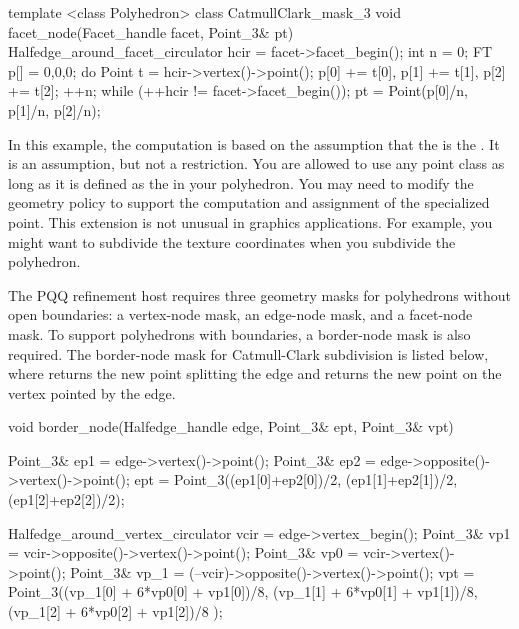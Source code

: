 \begin{ccExampleCode}
template <class Polyhedron>
class CatmullClark_mask_3 {
  void facet_node(Facet_handle facet, Point_3& pt) {
    Halfedge_around_facet_circulator hcir = facet->facet_begin();
    int n = 0;
    FT p[] = {0,0,0};
    do {
      Point t = hcir->vertex()->point();
      p[0] += t[0], p[1] += t[1], p[2] += t[2]; 
      ++n;
    } while (++hcir != facet->facet_begin());
    pt = Point(p[0]/n, p[1]/n, p[2]/n);
  }
}
\end{ccExampleCode}

In this example, the computation is based on the assumption that
the  is the . It is an assumption, 
but not a restriction.
You are allowed to use any point class as long as it is
defined as the  in your polyhedron.
You may need to modify the geometry policy to support the computation
and assignment of the specialized point. This extension is not unusual 
in graphics applications. For example, you might want to subdivide the
texture coordinates when you subdivide the polyhedron. 

The PQQ refinement host requires three geometry masks for 
polyhedrons without open boundaries: a vertex-node 
mask, an edge-node mask, and a facet-node mask. 
To support polyhedrons with boundaries, a border-node mask is 
also required. The border-node mask for Catmull-Clark subdivision
is listed below, where  returns the new point splitting the
edge and  returns the new point on the vertex pointed by
the edge.  


\begin{ccExampleCode}
  void border_node(Halfedge_handle edge, Point_3& ept, Point_3& vpt) {
    Point_3& ep1 = edge->vertex()->point();
    Point_3& ep2 = edge->opposite()->vertex()->point();
    ept = Point_3((ep1[0]+ep2[0])/2, (ep1[1]+ep2[1])/2, (ep1[2]+ep2[2])/2);

    Halfedge_around_vertex_circulator vcir = edge->vertex_begin();
    Point_3& vp1  = vcir->opposite()->vertex()->point();
    Point_3& vp0  = vcir->vertex()->point();
    Point_3& vp_1 = (--vcir)->opposite()->vertex()->point();
    vpt = Point_3((vp_1[0] + 6*vp0[0] + vp1[0])/8,
                (vp_1[1] + 6*vp0[1] + vp1[1])/8,
                (vp_1[2] + 6*vp0[2] + vp1[2])/8 );
  }
\end{ccExampleCode}



